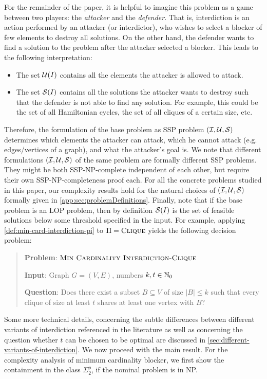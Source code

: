 For the remainder of the paper, it is helpful to imagine this problem as a game between two players: the \emph{attacker} and the \emph{defender}.
That is, interdiction is an action performed by an attacker (or interdictor), who wishes to select a blocker of few elements to destroy all solutions.
On the other hand, the defender wants to find a solution to the problem after the attacker selected a blocker.
This leads to the following interpretation:
\begin{itemize}
    \item The set $\mathcal{U}(I)$ contains all the elements the attacker is allowed to attack. 
    \item The set $\mathcal{S}(I)$ contains all the solutions the attacker wants to destroy such that the defender is not able to find any solution.
    For example, this could be the set of all Hamiltonian cycles, the set of all cliques of a certain size, etc.
\end{itemize}
Therefore, the formulation of the base problem as SSP problem $(\mathcal{I}, \mathcal{U}, \mathcal{S})$ determines which elements the attacker can attack, which he cannot attack (e.g. edges/vertices of a graph), and what the attacker's goal is.
We note that different formulations $(\mathcal{I}, \mathcal{U}, \mathcal{S})$ of the same problem are formally different SSP problems. They might be both SSP-NP-complete independent of each other, but require their own SSP-NP-completeness proof each.
For all the concrete problems studied in this paper, our complexity results hold for the natural choices of $(\mathcal{I}, \mathcal{U}, \mathcal{S})$ formally given in \cref{app:sec:problemDefinitions}.
Finally, note that if the base problem is an LOP problem, then by definition $\mathcal{S}(I)$ is the set of feasible solutions below some threshold specified in the input. 
For example, applying \cref{def:min-card-interdiction-pi} to $\Pi = \textsc{Clique}$ yields the following decision problem: 
\begin{quote}
    \textbf{Problem}: $\textsc{Min Cardinality Interdiction-Clique}$

    \textbf{Input}: Graph $G = (V, E)$, numbers $k, t \in\mathbb{N}_0$

    \textbf{Question}: Does there exist a subset $B \subseteq V$ of size $|B| \leq k$ such that every clique of size at least $t$ shares at least one vertex with $B$? 
\end{quote}

Some more technical details, concerning the subtle differences between different variants of interdiction referenced in the literature as well as concerning the question whether $t$ can be chosen to be optimal are discussed in \cref{sec:different-variants-of-interdiction}.
We now proceed with the main result.
For the complexity analysis of minimum cardinality blocker, we first show the containment in the class $\Sigma^p_2$, if the nominal problem is in NP.

